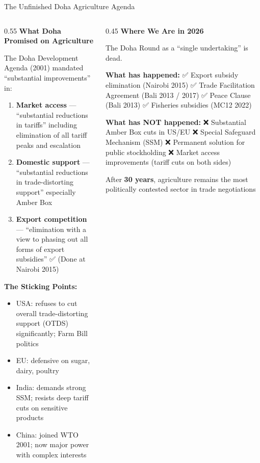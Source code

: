 \documentclass[
  ignorenonframetext,
  aspectratio=169,
]{beamer}
\makeatletter
\providecommand{\tightlist}{%
  \setlength{\itemsep}{0pt}\setlength{\parskip}{0pt}}
\let\quarto@originallabel\label
\DeclareRobustCommand*{\label}[1]{\quarto@originallabel{#1}}
\makeatother
\begin{document}
\begin{frame}{The Unfinished Doha Agriculture Agenda}
\label{the-unfinished-doha-agriculture-agenda}
\begin{columns}[T]
\begin{column}{0.55\linewidth}
\textbf{What Doha Promised on Agriculture}

The Doha Development Agenda (2001) mandated ``substantial improvements''
in:

\begin{enumerate}
\tightlist
\item
  \textbf{Market access} --- ``substantial reductions in tariffs''
  including elimination of all tariff peaks and escalation
\item
  \textbf{Domestic support} --- ``substantial reductions in
  trade-distorting support'' especially Amber Box
\item
  \textbf{Export competition} --- ``elimination with a view to phasing
  out all forms of export subsidies'' ✅ (Done at Nairobi 2015)
\end{enumerate}

\textbf{The Sticking Points:}

\begin{itemize}
\tightlist
\item
  USA: refuses to cut overall trade-distorting support (OTDS)
  significantly; Farm Bill politics
\item
  EU: defensive on sugar, dairy, poultry
\item
  India: demands strong SSM; resists deep tariff cuts on sensitive
  products
\item
  China: joined WTO 2001; now major power with complex interests
\end{itemize}
\end{column}

\begin{column}{0.45\linewidth}
\textbf{Where We Are in 2026}

The Doha Round as a ``single undertaking'' is dead.

\textbf{What has happened:} ✅ Export subsidy elimination (Nairobi 2015)
✅ Trade Facilitation Agreement (Bali 2013 / 2017) ✅ Peace Clause (Bali
2013) ✅ Fisheries subsidies (MC12 2022)

\textbf{What has NOT happened:} ❌ Substantial Amber Box cuts in US/EU
❌ Special Safeguard Mechanism (SSM) ❌ Permanent solution for public
stockholding ❌ Market access improvements (tariff cuts on both sides)

After \textbf{30 years}, agriculture remains the most politically
contested sector in trade negotiations
\end{column}
\end{columns}
\end{frame}
\end{document}
